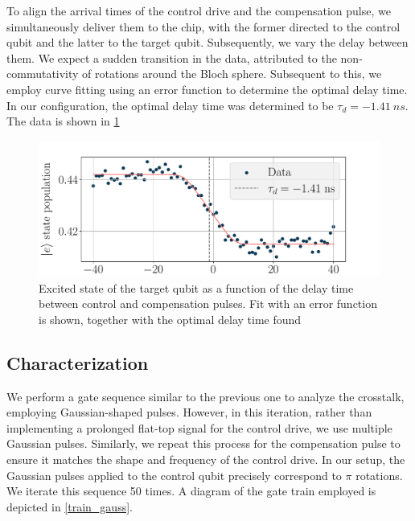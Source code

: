 To align the arrival times of the control drive and the compensation pulse, we simultaneously deliver them to the chip, with the former directed to the control qubit and the latter to the target qubit.
Subsequently, we vary the delay between them.
We expect a sudden transition in the data, attributed to the non-commutativity of rotations around the Bloch sphere.
Subsequent to this, we employ curve fitting using an error function to determine the optimal delay time.
In our configuration, the optimal delay time was determined to be $\tau_d = \SI{-1.41}{ns}$.
The data is shown in \cref{fig:delay}

\begin{figure}[b!]
    \centering
    \includegraphics[width=0.8\linewidth]{Images//Chap2.0/delay.pdf}
    \caption{Excited state of the target qubit as a function of the delay time between control and compensation pulses. Fit with an error function is shown, together with the optimal delay time found}
    \label{fig:delay}
\end{figure}

\subsection{Characterization}

We perform a gate sequence similar to the previous one to analyze the crosstalk, employing Gaussian-shaped pulses.
However, in this iteration, rather than implementing a prolonged flat-top signal for the control drive, we use multiple Gaussian pulses.
Similarly, we repeat this process for the compensation pulse to ensure it matches the shape and frequency of the control drive. 
In our setup, the Gaussian pulses applied to the control qubit precisely correspond to $\pi$ rotations.
We iterate this sequence 50 times.
A diagram of the gate train employed is depicted in \cref{train_gauss}.

